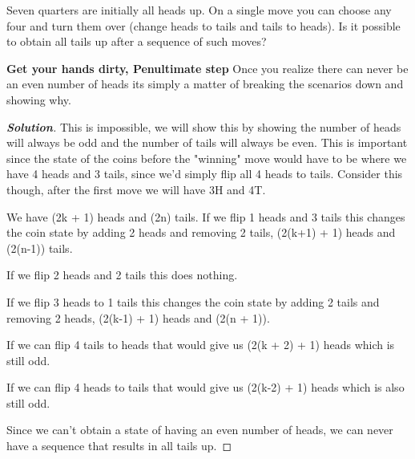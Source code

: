 \documentclass[11pt]{article}
\newenvironment{problem}[2][Problem\!]{\begin{trivlist}
\item[\hskip \labelsep {\bfseries #1}\hskip \labelsep {\bfseries #2}]}{\end{trivlist}}
\newenvironment{solution}{\begin{proof}[\textbf{\textit{Solution}}] }{\end{proof}}
\begin{document}
\begin{tcolorbox}
    \begin{problem}{10/11 IC (46.)} Seven quarters are initially all heads up. On a single move you can choose any four and turn them over (change heads to tails and tails to heads). Is it possible to obtain all tails up after a sequence of such moves?
    \end{problem}
    \textbf{Get your hands dirty, Penultimate step} Once you realize there can never be an even number of heads its simply a matter of breaking the scenarios down and showing why. 
\end{tcolorbox}
\begin{solution}
    This is impossible, we will show this by showing the number of heads will always be odd and the number of tails will always be even. This is important since the state of the coins before the "winning" move would have to be where we have 4 heads and 3 tails, since we'd simply flip all 4 heads to tails.
    Consider this though, after the first move we will have 3H and 4T.

    We have (2k + 1) heads and (2n) tails. If we flip 1 heads and 3 tails this changes the coin state by adding 2 heads and removing 2 tails, (2(k+1) + 1) heads and (2(n-1)) tails.

    If we flip 2 heads and 2 tails this does nothing.

    If we flip 3 heads to 1 tails this changes the coin state by adding 2 tails and removing 2 heads, (2(k-1) + 1) heads and (2(n + 1)). 

    If we can flip 4 tails to heads that would give us (2(k + 2) + 1) heads which is still odd.

    If we can flip 4 heads to tails that would give us (2(k-2) + 1) heads which is also still odd.

    Since we can't obtain a state of having an even number of heads, we can never have a sequence that results in all tails up.
\end{solution}
\end{document}
